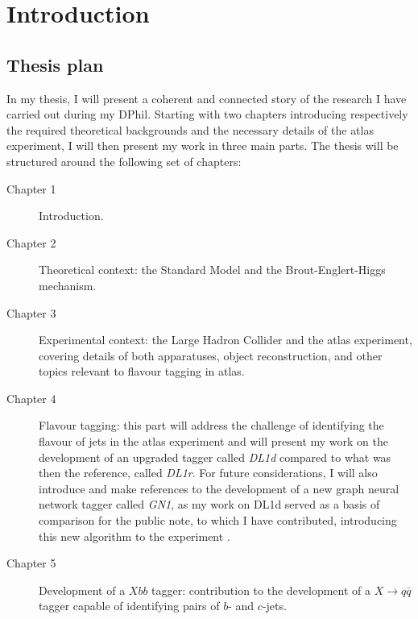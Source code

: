 \chapter{Introduction}
\section*{Thesis plan}
In my thesis, I will present a coherent and connected story of the research I have carried out during my DPhil. Starting with two chapters introducing respectively the required theoretical backgrounds and the necessary details of the \gls{atlas} experiment, I will then present my work in three main parts.  The thesis will be structured around the following set of chapters:
\begin{description}
\item[Chapter 1] Introduction. \\ \vspace{-15pt}
\item[Chapter 2] Theoretical context: the Standard Model and the Brout-Englert-Higgs mechanism. \\  \vspace{-15pt}
\item[Chapter 3] Experimental context: the Large Hadron Collider and the \gls{atlas} experiment, covering details of both apparatuses, object reconstruction, and other topics relevant to flavour tagging in \gls{atlas}. \\  \vspace{-15pt}
\item[Chapter 4] Flavour tagging: this part will address the challenge of identifying the flavour of jets in the \gls{atlas} experiment and will present my work on the development of an upgraded tagger called \textit{DL1d} compared to what was then the reference, called \textit{DL1r}. For future considerations, I will also introduce and make references to the development of a new graph neural network tagger called \textit{GN1}, as my work on DL1d served as a basis of comparison for the public note, to which I have contributed, introducing this new algorithm to the experiment \cite{ATL-PHYS-PUB-2022-027}. \\  \vspace{-15pt}
\item[Chapter 5] Development of a $Xbb$ tagger: contribution to the development of a $X \rightarrow q\bar{q}$ tagger capable of identifying pairs of $b$- and $c$-jets.

\end{description}
